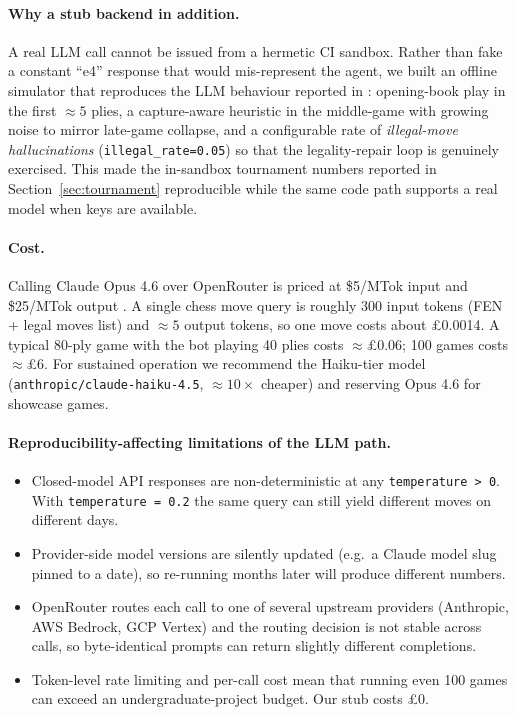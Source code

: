 \documentclass[11pt,a4paper]{article}
\begin{document}
\paragraph{Why a stub backend in addition.} A real LLM call cannot be
issued from a hermetic CI sandbox. Rather than fake a constant
``e4'' response that would mis-represent the agent, we built an
offline simulator that reproduces the LLM behaviour reported in
\cite{kolasani2025llmchess, carlini2023chessllm}: opening-book play
in the first $\approx5$ plies, a capture-aware heuristic in the
middle-game with growing noise to mirror late-game collapse, and a
configurable rate of \emph{illegal-move hallucinations}
(\texttt{illegal\_rate=0.05}) so that the legality-repair loop is
genuinely exercised. This made the in-sandbox tournament numbers
reported in Section~\ref{sec:tournament} reproducible while the same
code path supports a real model when keys are available.

\paragraph{Cost.} Calling Claude Opus 4.6 over OpenRouter is priced
at \$5/MTok input and \$25/MTok output \cite{claude-opus-46}. A
single chess move query is roughly 300 input tokens (FEN + legal
moves list) and ${\approx}5$ output tokens, so one move costs about
\pounds 0.0014. A typical 80-ply game with the bot playing 40 plies
costs ${\approx}$\pounds 0.06; 100 games costs ${\approx}$\pounds 6.
For sustained operation we recommend the Haiku-tier model
(\texttt{anthropic/claude-haiku-4.5}, ${\approx}10\times$ cheaper) and
reserving Opus 4.6 for showcase games.

\paragraph{Reproducibility-affecting limitations of the LLM path.}
\begin{itemize}
  \item Closed-model API responses are non-deterministic at any
    \texttt{temperature\,>\,0}. With \texttt{temperature\,=\,0.2} the
    same query can still yield different moves on different days.
  \item Provider-side model versions are silently updated (e.g.\
    a Claude model slug pinned to a date), so re-running months later
    will produce different numbers.
  \item OpenRouter routes each call to one of several upstream
    providers (Anthropic, AWS Bedrock, GCP Vertex) and the routing
    decision is not stable across calls, so byte-identical prompts
    can return slightly different completions.
  \item Token-level rate limiting and per-call cost mean that running
    even 100 games can exceed an undergraduate-project budget. Our
    stub costs \pounds 0.
\end{itemize}
\end{document}
